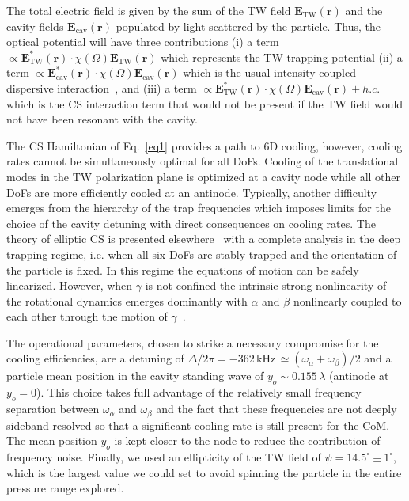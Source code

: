\documentclass[aps,pra,twocolumn,nopacs,superscriptaddress,groupedaddress]{revtex4}
\begin{document}
The total electric field is given by the sum of the TW field $\mathbf{E}_{\text{TW}}(\mathbf{r})$ and the cavity fields $\mathbf{E}_{\text{cav}}(\mathbf{r})$ populated by light scattered by the particle. Thus, the optical potential will have three contributions (i) a term $\propto\mathbf{E}^*_{\text{TW}}(\mathbf{r})\cdot \chi(\Omega) \mathbf{E}_{\text{TW}}(\mathbf{r})$ which represents the TW trapping potential (ii) a term $\propto\mathbf{E}^*_{\text{cav}}(\mathbf{r})\cdot \chi(\Omega) \mathbf{E}_{\text{cav}}(\mathbf{r})$ which is the usual intensity coupled dispersive interaction~\cite{giacomo2015,giacomo2016,Kiesel14180}, and (iii) a term $\propto\mathbf{E}^*_{\text{TW}}(\mathbf{r})\cdot \chi(\Omega) \mathbf{E}_{\text{cav}}(\mathbf{r})+ h.c.$ which is the CS interaction term that would not be present if the TW field would not have been resonant with the cavity.

The CS Hamiltonian of Eq.~\ref{eq1} provides a path to 6D cooling, however, cooling rates cannot be simultaneously optimal for all DoFs. Cooling of the translational modes in the TW polarization plane is optimized at a cavity node while all other DoFs are more efficiently cooled at an antinode. Typically, another difficulty emerges from the hierarchy of the trap frequencies which imposes limits for the choice of the cavity detuning with direct consequences on cooling rates. The theory of elliptic CS is presented elsewhere~\cite{elliptic_CS_pra} with a complete analysis in the deep trapping regime, i.e. when all six DoFs are stably trapped and the orientation of the particle is fixed. In this regime the equations of motion can be safely linearized. However, when $\gamma$ is not confined the intrinsic strong nonlinearity of the rotational dynamics emerges dominantly with $\alpha$ and $\beta$ nonlinearly coupled to each other through the motion of $\gamma$~\cite{tongcangli_5D,Robicheaux2019_PRA}.


The operational parameters, chosen to strike a necessary compromise for the cooling efficiencies, are a detuning of $\Delta/2\pi=-362$\,kHz\,$\simeq(\omega_{\alpha}+\omega_{\beta})/2$ and a particle mean position in the cavity standing wave of $y_o\sim0.155\,\lambda$ (antinode at $y_o=0$). This choice takes full advantage of the relatively small frequency separation between $\omega_{\alpha}$ and $\omega_{\beta}$ and the fact that these frequencies are not deeply sideband resolved so that a significant cooling rate is still present for the CoM. The mean position $y_o$ is kept closer to the node to reduce the contribution of frequency noise. Finally, we used an ellipticity of the TW field of $\psi=14.5^{\circ}\pm1^{\circ}$, which is the largest value we could set to avoid spinning the particle in the entire pressure range explored.
\end{document}
